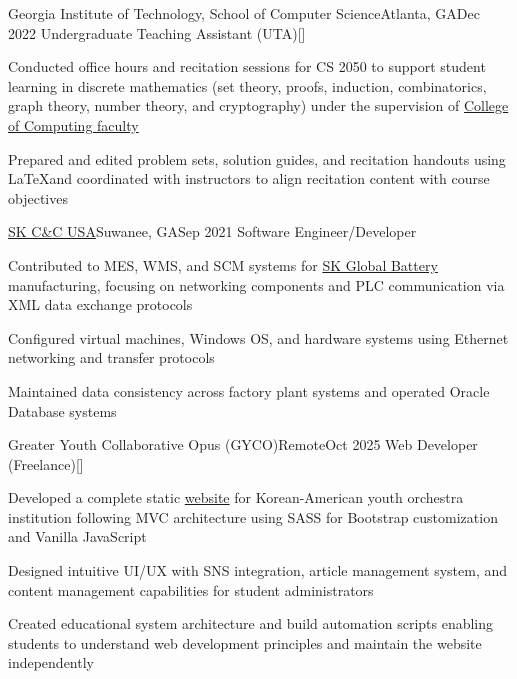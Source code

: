 \begin{resume-itemize}
  {Georgia Institute of Technology, School of Computer Science}{Atlanta, GA}{Dec 2022}
  {Undergraduate Teaching Assistant (UTA)}[\href{https://github.com/YundaeLeeSong/ydjs-references/tree/main/work2212-gt_compsci_ta}{}]
  \item Conducted office hours and recitation sessions for CS 2050 to support student learning in 
  discrete mathematics (set theory, proofs, induction, combinatorics, graph theory, number theory, and cryptography) 
  under the supervision of \href{https://www.cc.gatech.edu/people/faculty}{College of Computing faculty}
  \item Prepared and edited problem sets, solution guides, and recitation handouts using 
  \LaTeX and coordinated with instructors to align recitation content with course objectives
\end{resume-itemize}
\begin{resume-itemize}
  {\href{https://www.skaxus.com/}{SK C\&C USA}}{Suwanee, GA}{Sep 2021}
  {Software Engineer/Developer}
  \item Contributed to MES, WMS, and SCM systems for \href{https://www.skbatteryamerica.com/}{SK Global Battery} manufacturing, 
  focusing on networking components and PLC communication via XML data exchange protocols
  \item Configured virtual machines, Windows OS, and hardware systems using Ethernet networking and transfer protocols
  \item Maintained data consistency across factory plant systems and operated Oracle Database systems
\end{resume-itemize}
\begin{resume-itemize}
  {Greater Youth Collaborative Opus (GYCO)}{Remote}{Oct 2025}
  {Web Developer (Freelance)}[\href{https://github.com/kate-yk/kate-yk.github.io}{}]
  \item Developed a complete static \href{https://kate-yk.github.io/index.html}{website} for Korean-American youth orchestra institution 
  following MVC architecture using SASS for Bootstrap customization and Vanilla JavaScript
  \item Designed intuitive UI/UX with SNS integration, article management system, 
  and content management capabilities for student administrators
  \item Created educational system architecture and build automation scripts
  enabling students to understand web development principles and maintain the website independently
\end{resume-itemize}
